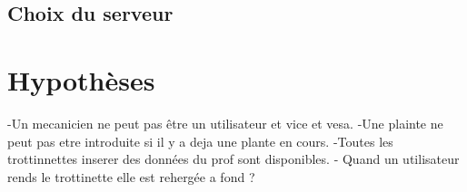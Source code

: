 \documentclass{article}
\begin{document}
\subsection*{Choix du serveur}

\section{Hypothèses}
-Un mecanicien ne peut pas être un utilisateur et vice et vesa.
-Une plainte ne peut pas etre introduite si il y a deja une plante en cours.
-Toutes les trottinnettes inserer des données du prof sont disponibles.
- Quand un utilisateur rends le trottinette elle est rehergée a fond ?
\end{document}
